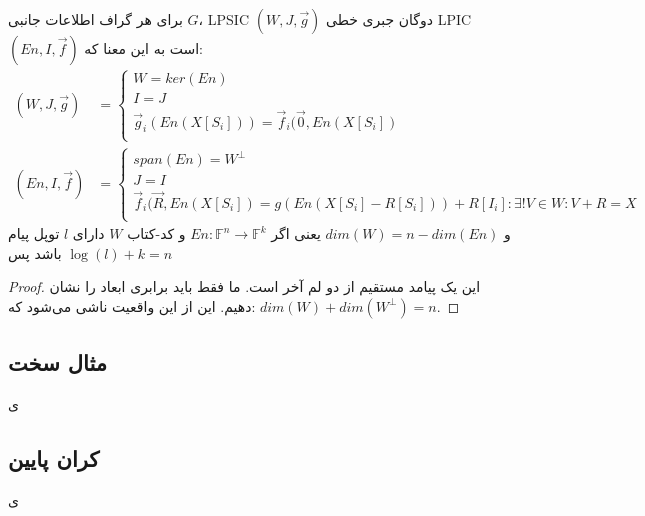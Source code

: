 \begin{theorem}
    \label{thm1}
    برای هر گراف اطلاعات جانبی 
    $G$، LPSIC $(W, J, \overrightarrow{g})$
     دوگان جبری خطی
      LPIC $(En, I, \overrightarrow{f})$ 
      است به این معنا که:
    \begin{align*}
    (W, J, \overrightarrow{g}) &= \begin{cases}
                                      W = ker(En)\\
                                      I = J \\
                                      \overrightarrow{g}_i(En(X[S_i])) = \overrightarrow{f}_i(\overrightarrow{0}, En(X[S_i])\\
    \end{cases} \\
    (En, I, \overrightarrow{f}) &= \begin{cases}
                                       span(En) = W^{\bot} \\
                                       J = I \\
                                       \overrightarrow{f}_i(\overrightarrow{R}, En(X[S_i]) = g(En(X[S_i] - R[S_i])) + R[I_i]: \exists! V \in W: V + R = X \\
    \end{cases}
    \end{align*}
    و 
    $dim(W) = n - dim(En)$
     یعنی اگر
     $En: \mathbb{F}^n \rightarrow \mathbb{F}^k$
      و کد-کتاب
      $W$ دارای $l$ توپل پیام باشد پس $\log(l) + k = n$
\end{theorem}
\begin{proof}
    این یک پیامد مستقیم از دو لم آخر است. ما فقط باید برابری ابعاد را نشان دهیم. این از این واقعیت ناشی می‌شود که: $dim(W) + dim(W^{\bot}) = n$.
\end{proof}
\subsection{
	مثال سخت
}
ی
\subsection{
	کران پایین
}
ی